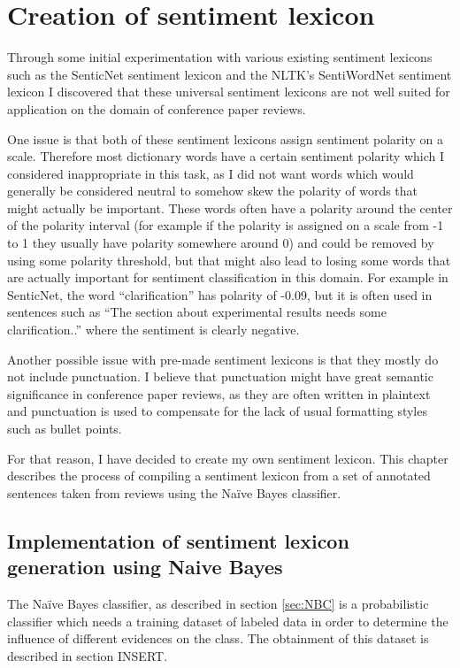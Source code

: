 \chapter{Creation of sentiment lexicon}
Through some initial experimentation with various existing sentiment lexicons such as the SenticNet sentiment lexicon and the NLTK's SentiWordNet sentiment lexicon I discovered that these universal sentiment lexicons are not well suited for application on the domain of conference paper reviews.

One issue is that both of these sentiment lexicons assign sentiment polarity on a scale. Therefore most dictionary words have a certain sentiment polarity which I considered inappropriate in this task, as I did not want words which would generally be considered neutral to somehow skew the polarity of words that might actually be important. These words often have a polarity around the center of the polarity interval (for example if the polarity is assigned on a scale from -1 to 1 they usually have polarity somewhere around 0) and could be removed by using some polarity threshold, but that might also lead to losing some words that are actually important for sentiment classification in this domain. For example in SenticNet, the word ``clarification'' has polarity of -0.09, but it is often used in sentences such as ``The section about experimental results needs some clarification..'' where the sentiment is clearly negative.

Another possible issue with pre-made sentiment lexicons is that they mostly do not include punctuation. I believe that punctuation might have great semantic significance in conference paper reviews, as they are often written in plaintext and punctuation is used to compensate for the lack of usual formatting styles such as bullet points. 


For that reason, I have decided to create my own sentiment lexicon. This chapter describes the process of compiling a sentiment lexicon from a set of annotated sentences taken from reviews using the Na\"ive Bayes classifier.
\section{Implementation of sentiment lexicon generation using Naive Bayes}
The Na\"ive Bayes classifier, as described in section \ref{sec:NBC} is a probabilistic classifier which needs a training dataset of labeled data in order to determine the influence of different evidences on the class. The obtainment of this dataset is described in section INSERT.

